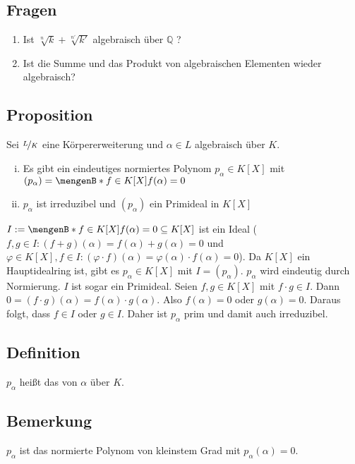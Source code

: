 \subsection[Fragen über algebraische Elemente]{Fragen} %
\label{sub:1115}
\begin{enumerate}[1)]
	\item Ist $\sqrt[n]{k} + \sqrt[n']{k'}$ algebraisch über $\mathds{Q}$ ?
	\item Ist die Summe und das Produkt von algebraischen Elementen wieder algebraisch?
\end{enumerate}

\subsection[Proposition: Minimalpolynom, Existenz und Eindeutigkeit]{Proposition} %
\label{sub:1116}
Sei $\nicefrac{L}{K}$ eine Körpererweiterung und $\alpha \in L$ algebraisch über $K$.
\begin{enumerate}[i)]
	\item Es gibt ein eindeutiges normiertes Polynom $p_\alpha \in K[X]$ mit $(p_\alpha) = \set[{f \in K[X]}]{f(\alpha)=0} $
	\item $p_\alpha$ ist irreduzibel und $(p_\alpha)$ ein Primideal in $K[X]$
\end{enumerate}
$I := \set[{f \in K[X]}]{f(\alpha)=0} \subseteq K[X] $ ist ein Ideal ($f,g \in I: (f+g)(\alpha)= f(\alpha)+ g(\alpha)=0$ und $\varphi \in K[X], f \in I : (\varphi \cdot f)(\alpha) = \varphi(\alpha) \cdot f(\alpha)=0$). Da $K[X]$ ein Hauptidealring ist, gibt es $p_\alpha \in K[X]$ mit $I= (p_\alpha)$. $p_\alpha$ wird eindeutig durch
Normierung. $I$ ist sogar ein Primideal. Seien $f,g \in K[X]$ mit $f \cdot g \in I$. Dann $0=(f \cdot g)(\alpha) = f(\alpha) \cdot g(\alpha)$. Also $f(\alpha)=0$ oder 
$g(\alpha)=0$. Daraus folgt, dass $f \in I$ oder $g \in I$. Daher ist $p_\alpha$ prim und damit auch irreduzibel. \bewende

\subsection[Definition: Minimalpolynom]{Definition} %
\label{sub:1117}
$p_\alpha$ heißt das  von $\alpha$ über $K$. 

\subsection[Bemerkung: Das Minimalpolynom ist das kleinste Polynom mit $\alpha$ als Nullstelle]{Bemerkung} %
\label{sub:1118}
$p_\alpha$ ist das normierte Polynom von kleinstem Grad mit $p_\alpha(\alpha)=0$.

